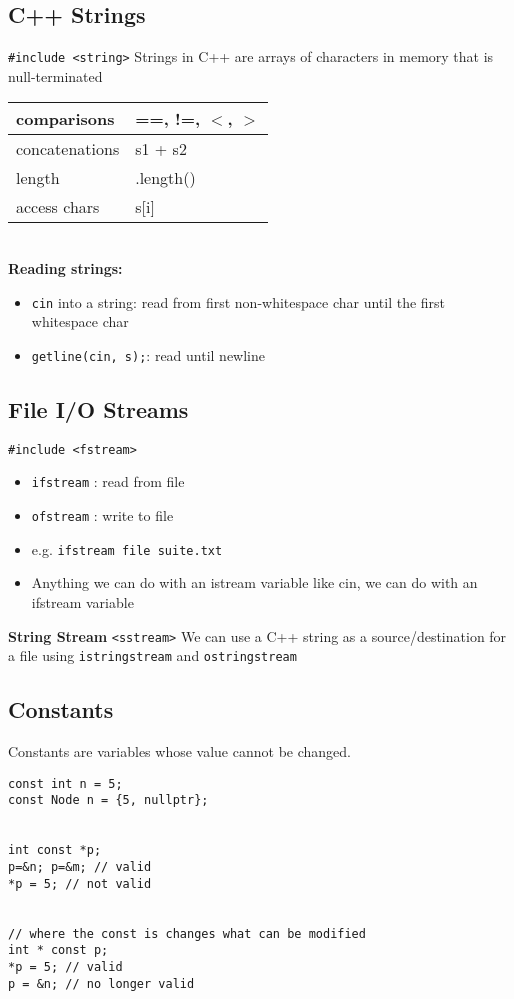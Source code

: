 \documentclass[12pt]{article}
\begin{document}
\subsection{C++ Strings}
\lstinline{#include <string>} Strings in C++ are arrays of characters in memory that is null-terminated\\
\begin{tabular}{l|l}
     comparisons & ==, !=, $<$, $>$   \\ \hline
     concatenations & s1 + s2 \\ \hline
     length & .length() \\ \hline
     access chars & s[i] \\ 
\end{tabular}
\\
\textbf{Reading strings: } 
\begin{itemize}
    \item \lstinline{cin} into a string: read from first non-whitespace char until the first whitespace char
    \item \lstinline{getline(cin, s);}: read until newline
\end{itemize}

\subsection{File I/O Streams}
\lstinline{#include <fstream>}
\begin{itemize}
    \item \lstinline{ifstream} : read from file
    \item \lstinline{ofstream} : write to file
    \item e.g. \lstinline{ifstream file suite.txt}
    \item Anything we can do with an istream variable like cin, we can do with an ifstream variable
\end{itemize}

\textbf{String Stream}
\lstinline{<sstream>} We can use a C++ string as a source/destination for a file using \lstinline{istringstream} and \lstinline{ostringstream}

\subsection{Constants}
Constants are variables whose value cannot be changed.
\begin{lstlisting}
const int n = 5; 
const Node n = {5, nullptr};


int const *p;
p=&n; p=&m; // valid
*p = 5; // not valid


// where the const is changes what can be modified
int * const p;
*p = 5; // valid
p = &n; // no longer valid
\end{lstlisting}
\end{document}
